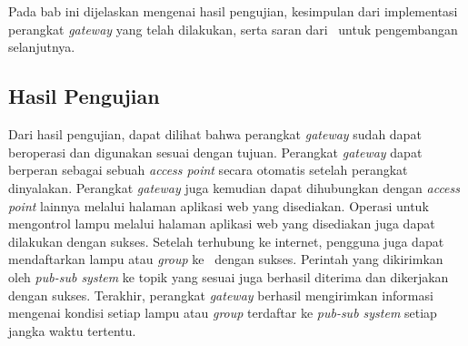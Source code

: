 \chapter{\babEnam}
Pada bab ini dijelaskan mengenai hasil pengujian, kesimpulan dari implementasi perangkat \textit{gateway} yang telah dilakukan, serta saran dari \saya~untuk pengembangan selanjutnya.

\section{Hasil Pengujian}
Dari hasil pengujian, dapat dilihat bahwa perangkat \textit{gateway} sudah dapat beroperasi dan digunakan sesuai dengan tujuan. Perangkat \textit{gateway} dapat berperan sebagai sebuah \textit{access point} secara otomatis setelah perangkat dinyalakan. Perangkat \textit{gateway} juga kemudian dapat dihubungkan dengan \textit{access point} lainnya melalui halaman aplikasi web yang disediakan. Operasi untuk mengontrol lampu melalui halaman aplikasi web yang disediakan juga dapat dilakukan dengan sukses. Setelah terhubung ke internet, pengguna juga dapat mendaftarkan lampu atau \textit{group} ke \plat~dengan sukses. Perintah yang dikirimkan oleh \textit{pub-sub system} ke topik yang sesuai juga berhasil diterima dan dikerjakan dengan sukses. Terakhir, perangkat \textit{gateway} berhasil mengirimkan informasi mengenai kondisi setiap lampu atau \textit{group} terdaftar ke \textit{pub-sub system} setiap jangka waktu tertentu.

